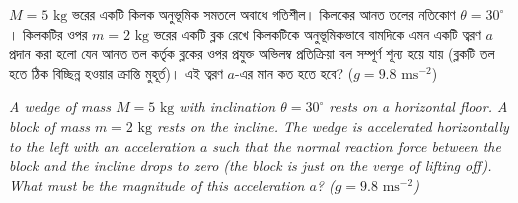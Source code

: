 \documentclass[12pt, a4paper]{article}
\begin{document}
\newpage

\begin{tcolorbox}[questionbox={প্রশ্ন (Question) 44}]
    \noindent
    $M = 5\text{ kg}$ ভরের একটি কিলক অনুভূমিক সমতলে অবাধে গতিশীল। কিলকের আনত তলের নতিকোণ $\theta = 30^\circ$। কিলকটির ওপর $m = 2\text{ kg}$ ভরের একটি ব্লক রেখে কিলকটিকে অনুভূমিকভাবে বামদিকে এমন একটি ত্বরণ $a$ প্রদান করা হলো যেন আনত তল কর্তৃক ব্লকের ওপর প্রযুক্ত অভিলম্ব প্রতিক্রিয়া বল সম্পূর্ণ শূন্য হয়ে যায় (ব্লকটি তল হতে ঠিক বিচ্ছিন্ন হওয়ার ক্রান্তি মুহূর্ত)। এই ত্বরণ $a$-এর মান কত হতে হবে? ($g = 9.8\text{ ms}^{-2}$)
    
    \vspace{0.8em}
    \begin{english}
    \noindent\textit{\color{darkgray}
    A wedge of mass $M = 5\text{ kg}$ with inclination $\theta = 30^\circ$ rests on a horizontal floor. A block of mass $m = 2\text{ kg}$ rests on the incline. The wedge is accelerated horizontally to the left with an acceleration $a$ such that the normal reaction force between the block and the incline drops to zero (the block is just on the verge of lifting off). What must be the magnitude of this acceleration $a$? ($g = 9.8\text{ ms}^{-2}$)
    }
    \end{english}
\end{tcolorbox}

\vspace{1em}
\begin{center}
\end{center}
\vspace{1em}
\end{document}
